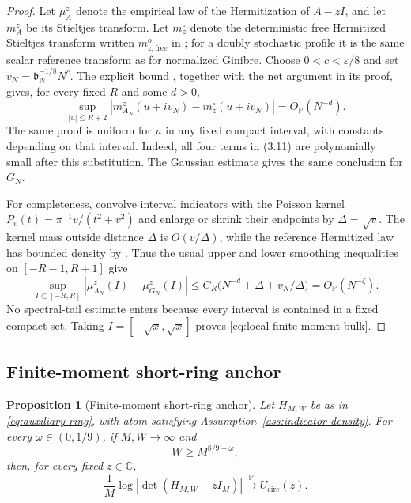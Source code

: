 \documentclass[11pt,reqno]{amsart}
\numberwithin{equation}{section}
\newtheorem{proposition}[theorem]{Proposition}
\theoremstyle{definition}
\theoremstyle{remark}
\newcommand{\C}{\mathbb C}
\newcommand{\Pp}{\mathbb P}
\newcommand{\1}{\mathbf 1}
\newcommand{\cir}{\mathrm{circ}}
\begin{document}
\begin{proof}
Let $\mu_A^z$ denote the empirical law of the Hermitization of $A-zI$,
and let $m_A^z$ be its Stieltjes transform.  Let $m_z^\circ$ denote the
deterministic free Hermitized Stieltjes transform written
$m_{z,\mathrm{free}}^o$ in \cite{Han2410}; for a doubly stochastic profile
it is the same scalar reference transform as for normalized Ginibre.  Choose
$0<c<\varepsilon/8$ and set $v_N=\mathfrak b_N^{-1/8}N^c$.
The explicit bound \cite[Proposition~3.4, (3.11)]{Han2410}, together with
the net argument in its proof, gives, for every fixed $R$ and some $d>0$,
\begin{equation}\label{eq:local-stieltjes-comparison}
 \sup_{|u|\le R+2}
 |m_{A_N}^z(u+iv_N)-m_z^\circ(u+iv_N)|
 =O_{\Pp}(N^{-d}).
\end{equation}
The same proof is uniform for $u$ in any fixed compact interval, with
constants depending on that interval.
Indeed, all four terms in (3.11) are polynomially small after this
substitution.  The Gaussian estimate \cite[(3.16)]{Han2410} gives the same
conclusion for $G_N$.

For completeness, convolve interval indicators with the Poisson kernel
$P_v(t)=\pi^{-1}v/(t^2+v^2)$ and enlarge or shrink their endpoints by
$\Delta=\sqrt v$.  The kernel mass outside distance $\Delta$ is
$O(v/\Delta)$, while the reference Hermitized law has bounded density by
\cite[(3.15) and the proof of Theorem~3.6]{Han2410}.  Thus the usual upper
and lower smoothing inequalities on $[-R-1,R+1]$ give
\[
 \sup_{I\subset[-R,R]}
 |\mu_{A_N}^z(I)-\mu_{G_N}^z(I)|
 \le C_R\bigl(N^{-d}+\Delta+v_N/\Delta\bigr)
 =O_{\Pp}(N^{-\zeta}).
\]
No spectral-tail estimate enters because every interval is contained in a
fixed compact set.  Taking $I=[-\sqrt x,\sqrt x]$ proves
\eqref{eq:local-finite-moment-bulk}.
\end{proof}

\subsection{Finite-moment short-ring anchor}

\begin{proposition}[Finite-moment short-ring anchor]
\label{prop:finite-moment-anchor}
Let $H_{M,W}$ be as in \eqref{eq:auxiliary-ring}, with atom satisfying
Assumption~\ref{ass:indicator-density}.  For every
$\omega\in(0,1/9)$, if $M,W\to\infty$ and
\begin{equation}\label{eq:finite-moment-high-band}
 W\ge M^{8/9+\omega},
\end{equation}
then, for every fixed $z\in\C$,
\begin{equation}\label{eq:HB-anchor}
 \frac1M\log|\det(H_{M,W}-zI_M)|
 \xrightarrow{\Pp}U_{\cir}(z).
\end{equation}
\end{proposition}
\end{document}
